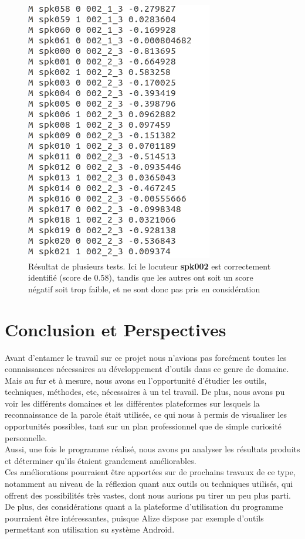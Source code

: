 \documentclass[a4paper, 12pt]{book}
\newcounter{program}[subsection]
\begin{document}
\begin{figure}[htbp]
  \centering
  \includegraphics[width=0.5\linewidth]{images/badResultExample.png}
  \caption{Résultat de plusieurs tests. Ici le locuteur \textbf{spk002} est correctement identifié (score de 0.58), tandis que les autres ont soit un score négatif soit trop faible, et ne sont donc pas pris en considération}
\end{figure}


\chapter{Conclusion et Perspectives\label{chap-conclusion}}

Avant d'entamer le travail sur ce projet nous n'avions pas forcément toutes les connaissances nécessaires au développement d'outils dans ce genre de domaine.
Mais au fur et à mesure, nous avons eu l'opportunité d'étudier les outils, techniques, méthodes, etc, nécessaires à un tel travail.
De plus, nous avons pu voir les différents domaines et les différentes plateformes sur lesquels la reconnaissance de la parole était utilisée, ce qui nous à permis de visualiser les opportunités possibles, tant sur un plan professionnel que de simple curiosité personnelle.\\

Aussi, une fois le programme réalisé, nous avons pu analyser les résultats produits et déterminer qu'ils étaient grandement améliorables.\\

Ces améliorations pourraient être apportées sur de prochains travaux de ce type, notamment au niveau de la réflexion quant aux outils ou techniques utilisés, qui offrent des possibilités très vastes, dont nous aurions pu tirer un peu plus parti. De plus, des considérations quant a la plateforme d'utilisation du programme pourraient être intéressantes, puisque Alize dispose par exemple d'outils permettant son utilisation su système Android.
\end{document}
